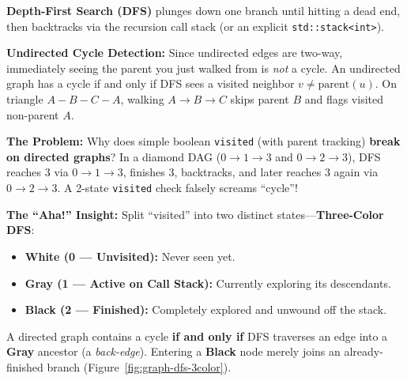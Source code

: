 \documentclass[11pt,a4paper]{article}
\theoremstyle{definition}
\newcommand{\painbeat}{\textbf{\color{accentamber}The Problem:} }
\newcommand{\ahabeat}{\textbf{\color{accentteal}The ``Aha!'' Insight:} }
\begin{document}
\textbf{Depth-First Search (DFS)} plunges down one branch until hitting a dead end, then backtracks via the recursion call stack (or an explicit \texttt{std::stack<int>}).

\textbf{Undirected Cycle Detection:} Since undirected edges are two-way, immediately seeing the parent you just walked from is \emph{not} a cycle. An undirected graph has a cycle if and only if DFS sees a visited neighbor $v \neq \text{parent}(u)$. On triangle $A - B - C - A$, walking $A \to B \to C$ skips parent $B$ and flags visited non-parent $A$.

\painbeat Why does simple boolean \texttt{visited} (with parent tracking) \textbf{break on directed graphs}? In a diamond DAG ($0 \to 1 \to 3$ and $0 \to 2 \to 3$), DFS reaches $3$ via $0 \to 1 \to 3$, finishes $3$, backtracks, and later reaches $3$ again via $0 \to 2 \to 3$. A 2-state \texttt{visited} check falsely screams ``cycle''!

\ahabeat Split ``visited'' into two distinct states---\textbf{Three-Color DFS}:
\begin{itemize}
    \item \textbf{White (0 --- Unvisited):} Never seen yet.
    \item \textbf{Gray (1 --- Active on Call Stack):} Currently exploring its descendants.
    \item \textbf{Black (2 --- Finished):} Completely explored and unwound off the stack.
\end{itemize}
A directed graph contains a cycle \textbf{if and only if} DFS traverses an edge into a \textbf{Gray} ancestor (a \emph{back-edge}). Entering a \textbf{Black} node merely joins an already-finished branch (Figure~\ref{fig:graph-dfs-3color}).
\end{document}
